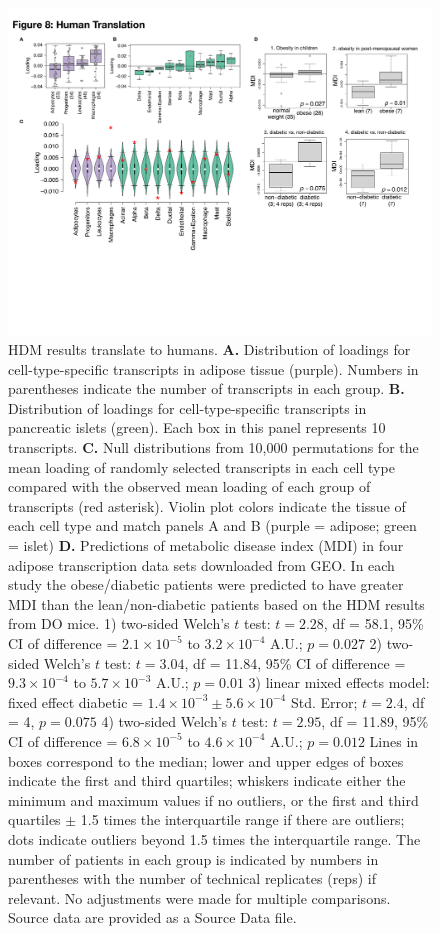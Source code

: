 \documentclass[
]{article}
\begin{document}
\begin{figure}[ht!]
\includegraphics[width=\textwidth]{Figures/Fig8_Human_Translation.pdf} 
\caption{HDM results translate to humans. \textbf{A.} Distribution of 
loadings for cell-type-specific transcripts in adipose tissue
(purple). Numbers in parentheses indicate the number of 
transcripts in each group. \textbf{B.} Distribution of loadings 
for cell-type-specific transcripts in pancreatic islets (green). 
Each box in this panel represents 10 transcripts. \textbf{C.} 
Null distributions from 10,000 permutations for the mean 
loading of randomly selected transcripts in each cell type 
compared with the observed mean loading of each group 
of transcripts (red asterisk). Violin plot colors indicate the 
tissue of each cell type and match panels A and B 
(purple = adipose; green = islet) \textbf{D.} Predictions of 
metabolic disease index (MDI) in four adipose transcription 
data sets downloaded from GEO. In each study the 
obese/diabetic patients were predicted to have greater 
MDI than the lean/non-diabetic patients based on the 
HDM results from DO mice. 1) two-sided Welch's $t$ test: $t = 2.28$, 
df = 58.1, 95\% CI of difference = $2.1\times10^{-5}$ 
to $3.2\times10^{-4}$ A.U.; $p = 0.027$
2) two-sided Welch's $t$ test: $t = 3.04$, 
df = 11.84, 95\% CI of difference = $9.3\times10^{-4}$ 
to $5.7\times10^{-3}$ A.U.; $p = 0.01$
3) linear mixed effects model: 
fixed effect diabetic = 
$1.4\times10^{-3}\pm5.6\times10^{-4}$ Std. Error;
$t = 2.4$, df = 4, $p = 0.075$
4) two-sided Welch's $t$ test: $t = 2.95$, 
df = 11.89, 95\% CI of difference = $6.8\times10^{-5}$ 
to $4.6\times10^{-4}$ A.U.; $p = 0.012$
Lines in boxes correspond to the 
median; lower and upper edges of boxes indicate the 
first and third quartiles; whiskers indicate either the minimum
and maximum values if no outliers, or the first and third quartiles 
$\pm$ 1.5 times the interquartile range if there are outliers; 
dots indicate outliers beyond 1.5 times the interquartile range. 
The number of patients in each group is indicated by numbers 
in parentheses with the number of technical replicates (reps) if 
relevant. No adjustments were made for multiple comparisons. 
Source data are provided as a Source Data file.
}
\label{fig:human_translation}
\end{figure}
\end{document}

